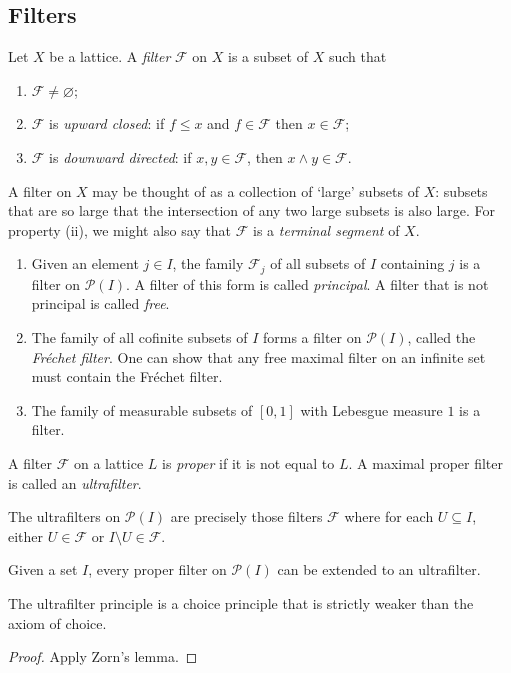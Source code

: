 \subsection{Filters}
\begin{definition}
    Let \( X \) be a lattice.
    A \emph{filter} \( \mathcal F \) on \( X \) is a subset of \( X \) such that
    \begin{enumerate}
        \item \( \mathcal F \neq \varnothing \);
        \item \( \mathcal F \) is \emph{upward closed}: if \( f \leq x \) and \( f \in \mathcal F \) then \( x \in \mathcal F \);
        \item \( \mathcal F \) is \emph{downward directed}: if \( x, y \in \mathcal F \), then \( x \wedge y \in \mathcal F \).
    \end{enumerate}
\end{definition}
A filter on \( X \) may be thought of as a collection of `large' subsets of \( X \): subsets that are so large that the intersection of any two large subsets is also large.
For property (ii), we might also say that \( \mathcal F \) is a \emph{terminal segment} of \( X \).
\begin{example}
    \begin{enumerate}
        \item Given an element \( j \in I \), the family \( \mathcal F_j \) of all subsets of \( I \) containing \( j \) is a filter on \( \mathcal P(I) \).
        A filter of this form is called \emph{principal}.
        A filter that is not principal is called \emph{free}.
        \item The family of all cofinite subsets of \( I \) forms a filter on \( \mathcal P(I) \), called the \emph{Fr\'echet filter}.
        One can show that any free maximal filter on an infinite set must contain the Fr\'echet filter.
        \item The family of measurable subsets of \( [0,1] \) with Lebesgue measure \( 1 \) is a filter.
    \end{enumerate}
\end{example}
\begin{definition}
    A filter \( \mathcal F \) on a lattice \( L \) is \emph{proper} if it is not equal to \( L \).
    A maximal proper filter is called an \emph{ultrafilter}.
\end{definition}
The ultrafilters on \( \mathcal P(I) \) are precisely those filters \( \mathcal F \) where for each \( U \subseteq I \), either \( U \in \mathcal F \) or \( I \setminus U \in \mathcal F \).
\begin{proposition}
    Given a set \( I \), every proper filter on \( \mathcal P(I) \) can be extended to an ultrafilter.
\end{proposition}
The ultrafilter principle is a choice principle that is strictly weaker than the axiom of choice.
\begin{proof}
    Apply Zorn's lemma.
\end{proof}

